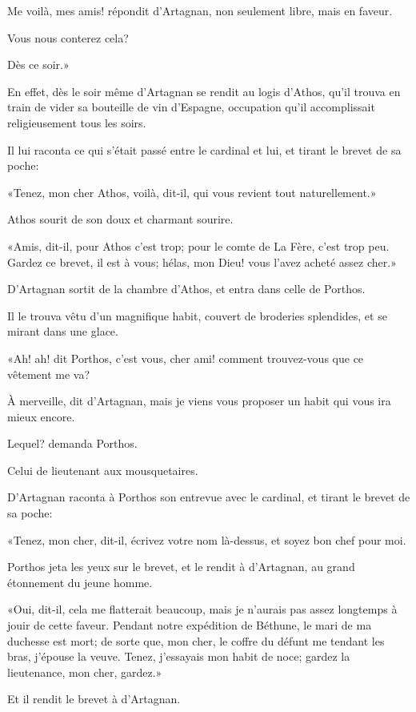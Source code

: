 \speak  Me voilà, mes amis! répondit d'Artagnan, non seulement libre, mais en faveur. 

\speak  Vous nous conterez cela? 

\speak  Dès ce soir.» 

En effet, dès le soir même d'Artagnan se rendit au logis d'Athos, qu'il trouva en train de vider sa bouteille de vin d'Espagne, occupation qu'il accomplissait religieusement tous les soirs. 

Il lui raconta ce qui s'était passé entre le cardinal et lui, et tirant le brevet de sa poche: 

«Tenez, mon cher Athos, voilà, dit-il, qui vous revient tout naturellement.» 

Athos sourit de son doux et charmant sourire. 

«Amis, dit-il, pour Athos c'est trop; pour le comte de La Fère, c'est trop peu. Gardez ce brevet, il est à vous; hélas, mon Dieu! vous l'avez acheté assez cher.» 

D'Artagnan sortit de la chambre d'Athos, et entra dans celle de Porthos. 

Il le trouva vêtu d'un magnifique habit, couvert de broderies splendides, et se mirant dans une glace. 

«Ah! ah! dit Porthos, c'est vous, cher ami! comment trouvez-vous que ce vêtement me va? 

\speak  À merveille, dit d'Artagnan, mais je viens vous proposer un habit qui vous ira mieux encore. 

\speak  Lequel? demanda Porthos. 

\speak  Celui de lieutenant aux mousquetaires. 

D'Artagnan raconta à Porthos son entrevue avec le cardinal, et tirant le brevet de sa poche: 

«Tenez, mon cher, dit-il, écrivez votre nom là-dessus, et soyez bon chef pour moi. 

Porthos jeta les yeux sur le brevet, et le rendit à d'Artagnan, au grand étonnement du jeune homme. 

«Oui, dit-il, cela me flatterait beaucoup, mais je n'aurais pas assez longtemps à jouir de cette faveur. Pendant notre expédition de Béthune, le mari de ma duchesse est mort; de sorte que, mon cher, le coffre du défunt me tendant les bras, j'épouse la veuve. Tenez, j'essayais mon habit de noce; gardez la lieutenance, mon cher, gardez.» 

Et il rendit le brevet à d'Artagnan. 

